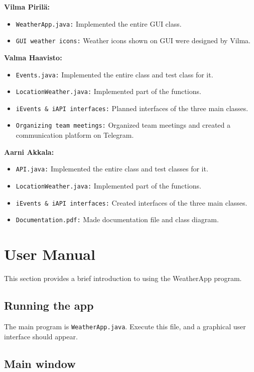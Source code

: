 \documentclass[a4paper,10pt]{article}
\begin{document}
\textbf{Vilma Pirilä:}
\begin{itemize}
    \item \texttt{WeatherApp.java:} Implemented the entire GUI class.
    \item \texttt{GUI weather icons:} Weather icons shown on GUI were designed by Vilma.
\end{itemize}

\textbf{Valma Haavisto:}
\begin{itemize}
    \item \texttt{Events.java:} Implemented the entire class and test class for it.
    \item \texttt{LocationWeather.java:} Implemented part of the functions.
    \item \texttt{iEvents \& iAPI interfaces:} Planned interfaces of the three main classes.
    \item \texttt{Organizing team meetings:} Organized team meetings and created a communication platform on Telegram.
\end{itemize}

\textbf{Aarni Akkala:}
\begin{itemize}
    \item \texttt{API.java:} Implemented the entire class and test classes for it.
    \item \texttt{LocationWeather.java:} Implemented part of the functions.
    \item \texttt{iEvents \& iAPI interfaces:} Created interfaces of the three main classes.
    \item \texttt{Documentation.pdf:} Made documentation file and class diagram.
\end{itemize}


\section{User Manual}

This section provides a brief introduction to using the WeatherApp program.

\subsection{Running the app}

The main program is \texttt{WeatherApp.java}. Execute this file, and a graphical user interface should appear.

\subsection{Main window}
\end{document}

